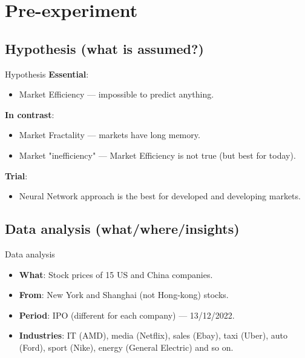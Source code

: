 \documentclass[11pt, aspectratio= 169]{beamer}
\begin{document}
	\section{Pre-experiment}
	\subsection{Hypothesis (what is assumed?)}
	\begin{frame}{Hypothesis}
		\Large
		\textbf{Essential}:
		\begin{itemize}
			\item Market Efficiency \cite{fama1970efficient} --- impossible to predict anything.
		\end{itemize}
		
		\textbf{In contrast}:
		\begin{itemize}
			\item Market Fractality \cite{mandelbrot2006misbehavior} --- markets have long memory.
			\item Market "inefficiency" \cite{matrin2011history} --- Market Efficiency is not true (but best for today).
		\end{itemize}
	
		\textbf{Trial}:
		\begin{itemize}
			\item Neural Network approach is the best for developed and developing markets. 
		\end{itemize}
	\end{frame}
	
	\subsection{Data analysis (what/where/insights)}
	\begin{frame}{Data analysis}
		\Large
		\begin{itemize}
			\item[] \textbf{What}: Stock prices of 15 US and China companies.
			\item[] \textbf{From}: New York and Shanghai (not Hong-kong) stocks.
			\item[] \textbf{Period}: IPO (different for each company) --- 13/12/2022.
			\item[] \textbf{Industries}: IT (AMD), media (Netflix), sales (Ebay), taxi (Uber), auto (Ford), sport (Nike), energy (General Electric) and so on.
		\end{itemize}
	\end{frame}
\end{document}
